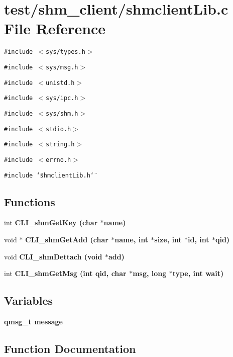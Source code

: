 \section{test/shm\_\-client/shmclient\-Lib.c File Reference}
\label{shm__client_2shmclientLib_8c}
{\tt \#include $<$sys/types.h$>$}\par
{\tt \#include $<$sys/msg.h$>$}\par
{\tt \#include $<$unistd.h$>$}\par
{\tt \#include $<$sys/ipc.h$>$}\par
{\tt \#include $<$sys/shm.h$>$}\par
{\tt \#include $<$stdio.h$>$}\par
{\tt \#include $<$string.h$>$}\par
{\tt \#include $<$errno.h$>$}\par
{\tt \#include \char`\"{}shmclient\-Lib.h\char`\"{}}\par
\subsection*{Functions}
\begin{CompactItemize}
\item 
int \bf{CLI\_\-shm\-Get\-Key} (char $\ast$name)
\item 
void $\ast$ \bf{CLI\_\-shm\-Get\-Add} (char $\ast$name, int $\ast$size, int $\ast$id, int $\ast$qid)
\item 
void \bf{CLI\_\-shm\-Dettach} (void $\ast$add)
\item 
int \bf{CLI\_\-shm\-Get\-Msg} (int qid, char $\ast$msg, long $\ast$type, int wait)
\end{CompactItemize}
\subsection*{Variables}
\begin{CompactItemize}
\item 
\bf{qmsg\_\-t} \bf{message}
\end{CompactItemize}


\subsection{Function Documentation}
